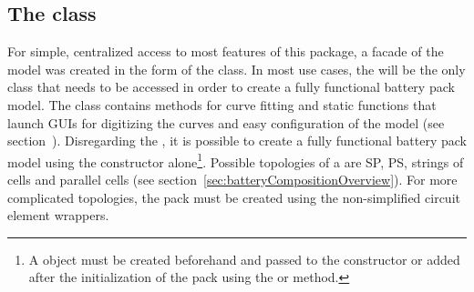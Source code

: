\subsection{The  class}
\label{sec:batteryPack}
For simple, centralized access to most features of this package, a facade of the model was created in the form of the  class. In most use cases, the  will be the only class that needs to be accessed in order to create a fully functional battery pack model. The class contains methods for curve fitting and static functions that launch GUIs for digitizing the curves and easy configuration of the model (see section~). Disregarding the , it is possible to create a fully functional battery pack model using the  constructor alone\footnote{A  object must be created beforehand and passed to the constructor or added after the initialization of the pack using the  or  method.}. Possible topologies of a  are SP, PS, strings of cells and parallel cells (see section~\ref{sec:batteryCompositionOverview}). For more complicated topologies, the pack must be created using the non-simplified circuit element wrappers. 

